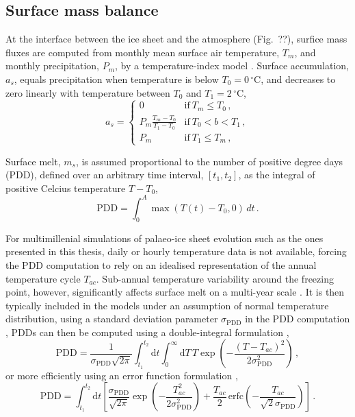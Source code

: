 \documentclass{article}
\newcommand{\unit}[1]{\ensuremath{\mathrm{#1}}}
\newcommand{\degree}[0]{\ensuremath{^{\circ}}}
\newcommand{\degC}[0]{\unit{{\degree}C}}
\begin{document}
\subsection{Surface mass balance}

\newcommand{\PDD}[0]{\mathrm{PDD}}
\newcommand{\sPDD}[0]{\sigma_{\mathrm{PDD}}}

At the interface between the ice sheet and the atmosphere (Fig.~??),
surfice mass fluxes are computed from monthly mean surface air temperature,
$T_m$, and monthly precipitation, $P_m$, by a temperature-index model
\citep[e.g.,][]{Hock.2003}. Surface accumulation, $a_s$, equals precipitation
when temperature is below ${T_0=0\,\degC}$, and decreases to zero linearly
with temperature between $T_0$ and ${T_1=2\,\degC}$,
\begin{equation}
    a_s =
    \begin{cases}
        0       & \text{if}\ T_m \le T_0 \,, \\
        P_m \frac{T_m-T_0}{T_1-T_0}
                & \text{if}\ T_0 < b < T_1 \,, \\
        P_m     & \text{if}\ T_1 \le T_m \,,
    \end{cases}
\end{equation}

Surface melt, $m_s$, is assumed proportional to the number of positive degree
days (PDD), defined over an arbitrary time interval, $[t_1, t_2]$, as the
integral of positive Celcius temperature $T-T_0$,
\begin{equation}
    \mathrm{PDD} = \int_{0}^{A}\max(T(t)-T_0,0)\,dt \,.
\end{equation}

For multimillenial simulations of palaeo-ice sheet evolution such as the ones
presented in this thesis, daily or hourly temperature data is not available,
forcing the PDD computation to rely on an idealised representation of the
annual temperature cycle $T_{ac}$. Sub-annual temperature variability around
the freezing point, however, significantly affects surface melt on a multi-year
scale \citep{Arnold.Mackay.1964}. It is then typically included in the models
under an assumption of normal temperature distribution, using a standard
deviation parameter $\sPDD$ in the PDD computation \citep{Braithwaite.1984},
PDDs can then be computed using a double-integral formulation
\citep{Reeh.1991},
\begin{equation}
    \PDD = \frac{1}{\sPDD\sqrt{2\pi}}
        \int_{t_1}^{t_2} \mathrm{d}t
        \int_{0}^{\infty} \mathrm{d}T \,
        T \exp\left({-\frac{(T-T_{ac})^2}{2\sPDD^2}}\right) \,,
\end{equation}
or more efficiently using an error function formulation
\citep{Calov.Greve.2005},
\begin{equation}
    \label{eqn:calovgreve}
    \PDD = \int_{t_1}^{t_2} \mathrm{d}t
        \left[\frac{\sPDD}{\sqrt{2\pi}}
                \exp\left({-\frac{T_{ac}^2}{2\sPDD^2}}\right)
              + \frac{T_{ac}}{2} \, \mathrm{erfc}
                \left(-\frac{T_{ac}}{\sqrt{2}\sPDD}\right)\right] \,.
\end{equation}
\end{document}
